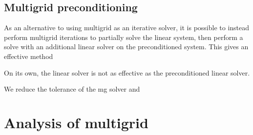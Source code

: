 \subsection{Multigrid preconditioning}

As an alternative to using multigrid as an iterative solver, it is possible to instead perform multigrid iterations to partially solve the linear system, then perform a solve with an additional linear solver on the preconditioned system.
This gives an effective method  

On its own, the linear solver is not as effective as the preconditioned linear solver.



We reduce the tolerance of the mg solver and 






\section{Analysis of multigrid}

